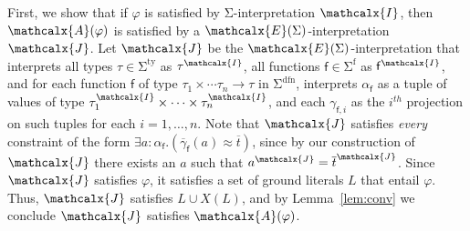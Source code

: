 \documentclass[runningheads,a4paper]{llncs}
\newcommand{\con}[1]{\mathsf{#1}}
\renewcommand\vec[1]{\overline{#1}}
\let\oldchi=\chi
\def\chi{{\vthinspace\oldchi}}
\let\oldSigma=\Sigma
\def\Sigma{\mathrm{\oldSigma}}
\newcommand{\teq}{\approx}
\newcommand{\I}{\mathcalx{I}}
\newcommand{\J}{\mathcalx{J}}
\newcommand{\conv}{\mathcalx{A}}
\newcommand{\stypes}[1]{#1^\mathrm{ty}}
\newcommand{\sfuns}[1]{#1^\mathrm{f}}
\newcommand{\sfundefs}[1]{#1^\mathrm{dfn}}
\newcommand{\ppos}{{+}}
\newcommand\ty[1]{\con{#1}}
\newcommand{\Bool}{\ty{Bool}}
\newcommand\concret{\gamma} %
\newcommand{\vecfarg}[1]{\vec{\concret}_{#1}}
\newcommand{\fargx}[2]{\concret_{#1,#2}}
\newcommand{\fargtype}[1]{\alpha_{#1}}
\newcommand{\extendsig}[1]{\mathcalx{E}( #1 )}
\newcommand{\vthinspace}{\kern+0.083333em}
\newcommand{\typ}[1]{^{\vthinspace #1}}
\newcommand{\absconstraints}{X}
\begin{document}
\begin{proofsketch}
First, we show that if $\varphi$ is satisfied by $\Sigma$-interpretation $\I$, then $\conv( \varphi )$ is satisfied by a $\extendsig{\Sigma}$-interpretation $\J$.
Let $\J$ be the $\extendsig{\Sigma}$-interpretation that interprets all types $\tau \in \stypes{\Sigma}$ as $\tau^\I$,
all functions $\con{f} \in \sfuns{\Sigma}$ as $\con{f}^\I$,
and for each function $\con{f}$ of type $\tau_1 \times \cdots \tau_n \rightarrow \tau$ in $\sfundefs{\Sigma}$,
interprets $\fargtype{\con{f}}$ as a tuple of values of type $\tau_1^\I \times \cdots \times \tau_n^\I$,
and each $\fargx{\con{f}}{i}$ as the $i^{th}$ projection on such tuples for each $i = 1, \ldots, n$.
Note that $\J$ satisfies \emph{every} constraint of the form $\exists a : {\fargtype{\con{f}}}. ( \vecfarg{\con{f}}( a ) \teq \vec t )$,
since by our construction of $\J$ there exists an $a$ such that $a^\J = \vec t^\J$.
Since $\J$ satisfies $\varphi$, it satisfies a set of ground literals $L$ that entail $\varphi$.
Thus, $\J$ satisfies $L \cup \absconstraints( L )$, and by Lemma~\ref{lem:conv} we conclude $\J$ satisfies $\conv( \varphi )$.


\end{proofsketch}
\end{document}
